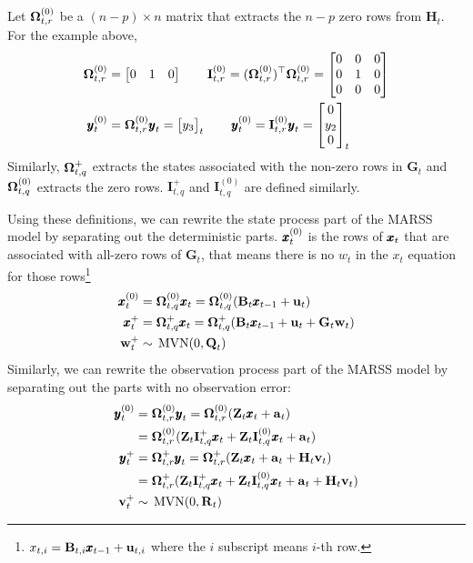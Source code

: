 \documentclass[]{article}
\def\OMG{\mbox{\boldmath $\Omega$}}
\def\UPS{\mbox{\boldmath $\Upsilon$}}
\def\XI{\mbox{\boldmath $\Xi$}}
\def\BB{\mbox{$\mathbf B$}}	\def\bb{\mbox{$\mathbf b$}} \def\Bb{\mbox{$\mathbf J$}} \def\Ba{\mbox{$\mathbf L$}} \def\Bm{\UPS}
\def\GG{\mbox{$\mathbf G$}}	\def\gg{\mbox{$\mathbf g$}}
\def\HH{\mbox{$\mathbf H$}}	\def\hh{\mbox{$\mathbf h$}}
\def\II{\mbox{$\mathbf I$}} \def\ii{\mbox{$\mathbf i$}}
\def\MVN{\,\textup{\textrm{MVN}}}
\def\QQ{\mbox{$\mathbf Q$}}	 \def\qq{\mbox{$\mathbf q$}} \def\Qb{\mbox{$\mathbf G$}}  \def\Qm{\mathbb{Q}}
\def\RR{\mbox{$\mathbf R$}}	 \def\rr{\mbox{$\mathbf r$}} \def\Rb{\mbox{$\mathbf H$}}	\def\Rm{\mathbb{R}}
\def\ZZ{\mbox{$\mathbf Z$}}	\def\zz{\mbox{$\mathbf z$}}	\def\Zb{\mbox{$\mathbf M$}} \def\Za{\mbox{$\mathbf N$}} \def\Zm{\XI}
\begin{document}
Let $\OMG_{t,r}^{(0)}$ be a $(n-p) \times n$  matrix that extracts the $n-p$ zero rows from $\HH_t$. For the example above, 
\begin{equation}
\begin{split}
\OMG_{t,r}^{(0)} &= 
\begin{bmatrix}
0&1&0\\
\end{bmatrix}\quad\quad
\II_{t,r}^{(0)} = (\OMG_{t,r}^{(0)})^\top\OMG_{t,r}^{(0)} = 
\begin{bmatrix}
0&0&0\\
0&1&0\\
0&0&0
\end{bmatrix}
\\
\yy_t^{(0)}&=\OMG_{t,r}^{(0)} \yy_t = \begin{bmatrix}
y_3
\end{bmatrix}_t\quad\quad
\yy_t^{(0)}=\II_{t,r}^{(0)} \yy_t = \begin{bmatrix}
0\\
y_2\\
0
\end{bmatrix}_t
\end{split}
\end{equation}
Similarly,  $\OMG_{t,q}^+$ extracts the states associated with the non-zero rows in $\GG_t$ and  $\OMG_{t,q}^{(0)}$ extracts the zero rows.  $\II_{t,q}^+$ and $\II_{t,q}^{(0)}$ are defined similarly.

Using these definitions, we can rewrite the state process part of the MARSS model by separating out the deterministic parts. $\mbox{$\pmb{x}$}_t^{(0)}$ is the rows of $\mbox{$\pmb{x}$}_t$ that are associated with all-zero rows of $\GG_t$, that means there is no $w_t$ in the $x_t$ equation for those rows\footnote{$x_{t,i}=\BB_{t,i}\xx_{t-1} + \uu_{t,i}$ where the $i$ subscript means $i$-th row.}
\begin{equation}\label{eq:degen.model.x1}
\begin{split}
\xx_t^{(0)}&=\OMG_{t,q}^{(0)}\xx_t=\OMG_{t,q}^{(0)}(\BB_t\xx_{t-1} + \uu_t)\\
\xx_t^+&=\OMG_{t,q}^+\xx_t=\OMG_{t,q}^+(\BB_t\xx_{t-1} + \uu_t + \GG_t\ww_t)\\
\ww_t^+ &\sim \MVN(0,\QQ_t)
\end{split}
\end{equation}
Similarly, we can rewrite the observation process part of the MARSS model by separating out the parts with no observation error:
\begin{equation}\label{eq:degen.model.y1}
\begin{split}
\yy_t^{(0)}&=\OMG_{t,r}^{(0)}\yy_t=\OMG_{t,r}^{(0)}(\ZZ_t\xx_t + \aa_t) \\
&=\OMG_{t,r}^{(0)}(\ZZ_t\II_{t,q}^+\xx_t + \ZZ_t\II_{t,q}^{(0)}\xx_t + \aa_t)\\
\yy_t^+&=\OMG_{t,r}^+\yy_t=\OMG_{t,r}^+(\ZZ_t\xx_t + \aa_t + \HH_t\vv_t)\\
&=\OMG_{t,r}^+(\ZZ_t\II_{t,q}^+\xx_t + \ZZ_t\II_{t,q}^{(0)}\xx_t + \aa_t+\HH_t\vv_t)\\
\vv_t^+ &\sim \MVN(0,\RR_t)
\end{split}
\end{equation}
\end{document}
